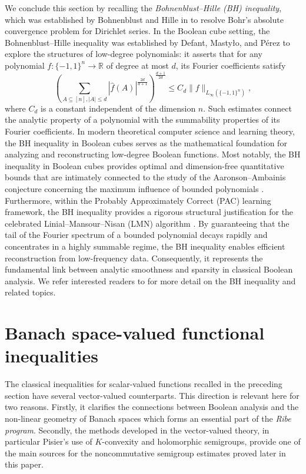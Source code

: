 \documentclass{amsbook}
\theoremstyle{definition}
\theoremstyle{remark}
\numberwithin{section}{chapter}
\numberwithin{equation}{chapter}
\newcommand{\1}{\mathbf{1}}
\begin{document}
We conclude this section by recalling the \emph{Bohnenblust--Hille (BH) inequality}, which was established by Bohnenblust and Hille in \cite{B-H1931} to resolve Bohr's absolute convergence problem for Dirichlet series.  In the Boolean cube setting, the Bohnenblust--Hille inequality was established by Defant, Masty\l o, and P\'erez \cite{D-M-P2019} to explore the structures of low-degree polynomials: it asserts that for any polynomial $f: \{-1,1\}^n \to \mathbb{R}$ of degree at most $d$, its Fourier coefficients satisfy
\[
\left( \sum_{A \subseteq [n], |A| \le d} |\widehat{f}(A)|^{\frac{2d}{d+1}} \right)^{\frac{d+1}{2d}} \le C_d \|f\|_{L_\infty(\{-1,1\}^{n})},
\]
where $C_{d}$ is a constant independent of the dimension $n$. Such estimates connect the analytic property of a polynomial with the summability properties of its Fourier coefficients. In modern theoretical computer science and learning theory, the BH inequality in Boolean cubes serves as the mathematical foundation for analyzing and reconstructing low-degree Boolean functions. Most notably, the BH inequality in Boolean cubes provides optimal and dimension-free quantitative bounds that are intimately connected to the study of the Aaronson--Ambainis conjecture concerning the maximum influence of bounded polynomials \cite{A-A2014}. Furthermore, within the Probably Approximately Correct (PAC) learning framework, the BH inequality provides a rigorous structural justification for the celebrated Linial--Mansour--Nisan (LMN) algorithm \cite{L-M-N1993}. By guaranteeing that the tail of the Fourier spectrum of a bounded polynomial decays rapidly and concentrates in a highly summable regime, the BH inequality enables efficient reconstruction from low-frequency data. Consequently, it represents the fundamental link between analytic smoothness and sparsity in classical Boolean analysis. We refer interested readers to \cite{A-S-E-P2025, B-S2026, EI2022, EZ2024, S-V-Z2024,V-Z2024} for more detail on the BH inequality and related topics.
\section{Banach space-valued functional inequalities}\label{vector-valued}

The classical inequalities for scalar-valued functions recalled in the preceding section have several vector-valued counterparts. This direction is relevant here for two reasons. Firstly, it clarifies the connections between Boolean analysis and the non-linear geometry of Banach spaces which forms an essential part of the \emph{Ribe program}. Secondly, the methods developed in the vector-valued theory, in particular Pisier's use of $K$-convexity and holomorphic semigroups, provide one of the main sources for the noncommutative semigroup estimates proved later in this paper.
\end{document}
